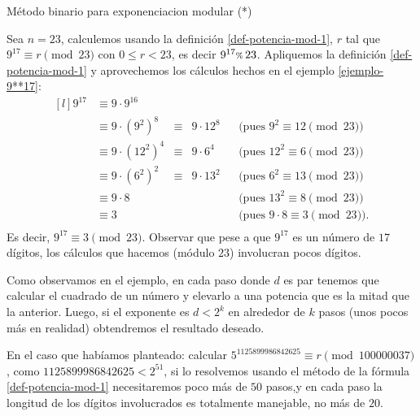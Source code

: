 \begin{section}{Método binario para exponenciacion modular (*)}
  \begin{ejemplo}
    Sea $n = 23$, calculemos usando  la definición \ref{def-potencia-mod-1}, $r$ tal que  $9^{17} \equiv r \pmod{23}$ con $0 \le r < 23$,  es decir $9^{17} {\scriptstyle \%}\, 23$. Apliquemos la definición \eqref{def-potencia-mod-1} y aprovechemos los cálculos hechos en el ejemplo \ref{ejemplo-9**17}:
    \begin{equation*}\label{eq-3**17-mod-21}
        \begin{matrix*}[l]
            9^{17}  &\equiv  9 \cdot 9^{16}& & &&\\
                    &\equiv  9 \cdot (9^{2})^8   &\equiv& 9 \cdot 12^8&&\text{(pues $9^2 \equiv 12 \pmod{23}$)} \\
                    &\equiv  9 \cdot (12^2)^4 &\equiv&  9 \cdot 6^4&&\text{(pues $12^2 \equiv 6\pmod{23}$)}  \\
                    &\equiv  9 \cdot (6^2)^2 &\equiv&  9 \cdot 13^2&&\text{(pues $6^2 \equiv 13 \pmod{23}$)}\\
                    &\equiv  9 \cdot 8 &&  &&\text{(pues $13^2 \equiv 8\pmod{23}$)}\\
                    &\equiv 3 &&  &&\text{(pues $9\cdot 8 \equiv 3 \pmod{23}$).}\\
        \end{matrix*}
    \end{equation*}
    Es decir, $9^{17} \equiv 3 \pmod{23}$. Observar que pese a que $9^{17}$ es un número de $17$ dígitos, los cálculos que hacemos (módulo $23$) involucran pocos dígitos.   

  \end{ejemplo}

Como observamos en el ejemplo,  en cada paso donde $d$ es par tenemos que calcular el cuadrado de un número y elevarlo a una potencia que es la mitad  que la anterior. Luego,  si  el exponente es $d < 2^k$ en alrededor de $k$ pasos (unos pocos más en realidad) obtendremos el resultado deseado. 

En  el caso  que habíamos planteado: calcular $ 5^{1125899986842625} \equiv r \pmod{100000037}$, como $1125899986842625 < 2^{51}$, si lo resolvemos usando el método de la fórmula \eqref{def-potencia-mod-1} necesitaremos poco más de $50$ pasos,y en cada paso la longitud de los dígitos involucrados es totalmente manejable, no más de $20$. 



\end{section}
